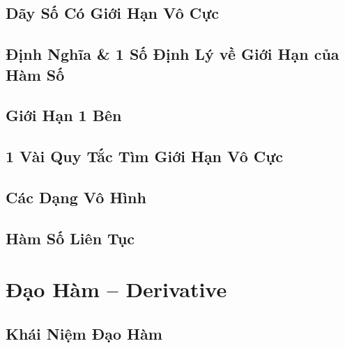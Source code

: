 \documentclass[oneside]{book}
\numberwithin{equation}{section}
\begin{document}

\section{Dãy Số Có Giới Hạn Vô Cực}


\section{Định Nghĩa \& 1 Số Định Lý về Giới Hạn của Hàm Số}


\section{Giới Hạn 1 Bên}


\section{1 Vài Quy Tắc Tìm Giới Hạn Vô Cực}


\section{Các Dạng Vô Hình}


\section{Hàm Số Liên Tục}


\chapter{Đạo Hàm -- Derivative}

\section{Khái Niệm Đạo Hàm}
\end{document}
